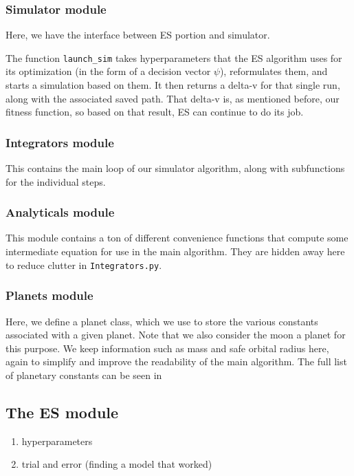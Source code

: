 \subsubsection{Simulator module}

Here, we have the interface between ES portion and simulator.

\noindent The function \texttt{launch\_sim} takes hyperparameters that the ES algorithm uses for its optimization (in the form of a decision vector \(\psi\)), reformulates them, and starts a simulation based on them. It then returns a delta-v for that single run, along with the associated saved path. That delta-v is, as mentioned before, our fitness function, so based on that result, ES can continue to do its job.

\subsubsection{Integrators module}

This contains the main loop of our simulator algorithm, along with subfunctions for the individual steps.

\subsubsection{Analyticals module}

This module contains a ton of different convenience functions that compute some intermediate equation for use in the main algorithm. They are hidden away here to reduce clutter in \texttt{Integrators.py}.

\subsubsection{Planets module}

Here, we define a planet class, which we use to store the various constants associated with a given planet. Note that we also consider the moon a planet for this purpose. We keep information such as mass and safe orbital radius here, again to simplify and improve the readability of the main algorithm. The full list of planetary constants can be seen in 

\subsection{The ES module}
\begin{enumerate}
    \item hyperparameters
    \item trial and error (finding a model that worked)
\end{enumerate}

